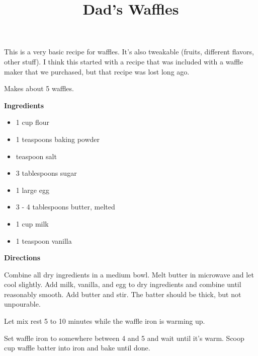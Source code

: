 \documentclass{article}
\title{Dad's Waffles}
\begin{document}
This is a very basic recipe for waffles. It's also tweakable (fruits, different
flavors, other stuff). I think this started with a recipe that was included
with a waffle maker that we purchased, but that recipe was lost long ago.

Makes about 5 waffles.

\bigskip
\bigskip

\textbf{Ingredients}

\begin{itemize}
      \item 1 cup flour
      \item 1 teaspoons baking powder
      \item {} teaspoon salt
      \item 3 tablespoons sugar
      \item 1 large egg
      \item 3 - 4 tablespoons butter, melted
      \item 1 cup milk
      \item 1 teaspoon vanilla
\end{itemize}

\bigskip

\textbf{Directions}

Combine all dry ingredients in a medium bowl. Melt butter in
microwave and let cool slightly. Add milk, vanilla, and egg to
dry ingredients and combine until reasonably smooth. Add butter and stir.
The batter should be thick, but not unpourable.

Let mix rest 5 to 10 minutes while the waffle iron is warming up.

Set waffle iron to somewhere between 4 and 5 and wait until it's warm.
Scoop  cup waffle batter into iron and bake until done.

\end{document}
